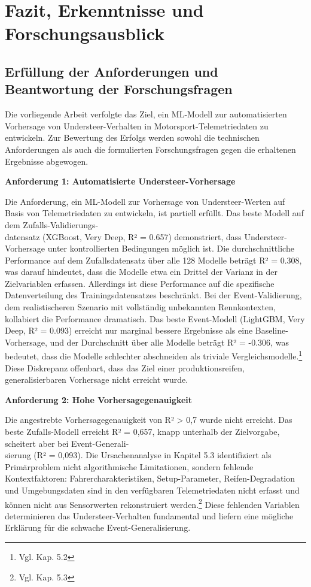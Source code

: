 \chapter{Fazit, Erkenntnisse und Forschungsausblick}

\section{Erfüllung der Anforderungen und Beantwortung der Forschungsfragen}

Die vorliegende Arbeit verfolgte das Ziel, ein \ac{ML}-Modell zur automatisierten Vorhersage von Understeer-Verhalten in Motorsport-Telemetriedaten zu entwickeln. Zur Bewertung des Erfolgs werden sowohl die technischen Anforderungen als auch die formulierten Forschungsfragen gegen die erhaltenen Ergebnisse abgewogen.

\textbf{Anforderung 1: Automatisierte Understeer-Vorhersage}

Die Anforderung, ein \ac{ML}-Modell zur Vorhersage von Understeer-Werten auf Basis von Telemetriedaten zu entwickeln, ist partiell erfüllt. Das beste Modell auf dem Zufalls-Validierungs-\\datensatz (XGBoost, Very Deep, R² = 0.657) demonstriert, dass Understeer-Vorhersage unter kontrollierten Bedingungen möglich ist. Die durchschnittliche Performance auf dem Zufallsdatensatz über alle 128 Modelle beträgt R² = 0.308, was darauf hindeutet, dass die Modelle etwa ein Drittel der Varianz in der Zielvariablen erfassen. Allerdings ist diese Performance auf die spezifische Datenverteilung des Trainingsdatensatzes beschränkt. Bei der Event-Validierung, dem realistischeren Szenario mit vollständig unbekannten Rennkontexten, kollabiert die Performance dramatisch. Das beste Event-Modell (LightGBM, Very Deep, R² = 0.093) erreicht nur marginal bessere Ergebnisse als eine Baseline-Vorhersage, und der Durchschnitt über alle Modelle beträgt R² = -0.306, was bedeutet, dass die Modelle schlechter abschneiden als triviale Vergleichsmodelle.\footnote{Vgl. Kap. 5.2} Diese Diskrepanz offenbart, dass das Ziel einer produktionsreifen, generalisierbaren Vorhersage nicht erreicht wurde.

\textbf{Anforderung 2: Hohe Vorhersagegenauigkeit}

Die angestrebte Vorhersagegenauigkeit von R² > 0,7 wurde nicht erreicht. Das beste Zufalls-Modell erreicht R² = 0,657, knapp unterhalb der Zielvorgabe, scheitert aber bei Event-Generali-\\sierung (R² = 0,093). Die Ursachenanalyse in Kapitel 5.3 identifiziert als Primärproblem nicht algorithmische Limitationen, sondern fehlende Kontextfaktoren: Fahrercharakteristiken, Setup-Parameter, Reifen-Degradation und Umgebungsdaten sind in den verfügbaren Telemetriedaten nicht erfasst und können nicht aus Sensorwerten rekonstruiert werden.\footnote{Vgl. Kap. 5.3} Diese fehlenden Variablen determinieren das Understeer-Verhalten fundamental und liefern eine mögliche Erklärung für die schwache Event-Generalisierung.



